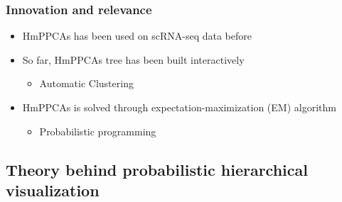 \documentclass{beamer}
\begin{document}
\begin{frame}
\frametitle{Innovation and relevance}
\begin{itemize}
    \item HmPPCAs has been used on scRNA-seq data before \cite{philipsthesis}
    \item So far, HmPPCAs tree has been built interactively
    \begin{itemize}
        \item Automatic Clustering
    \end{itemize}
    \item HmPPCAs is solved through expectation-maximization (EM) algorithm
    \begin{itemize}
        \item Probabilistic programming
    \end{itemize}
\end{itemize}
\end{frame}

\subsection{Theory behind probabilistic hierarchical visualization}
\end{document}
